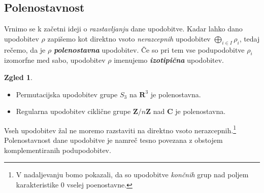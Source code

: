 \documentclass[11pt]{book}
\def\ZZ{\mathbf{Z}}
\def\RR{\mathbf{R}}
\def\CC{\mathbf{C}}
\def\definicija{\color{rdeca}\bf\em}
\theoremstyle{definition}
\theoremstyle{zgled}
\newtheorem*{zgled}{Zgled}
\theoremstyle{odprtproblem}
\theoremstyle{domacanaloga}
\theoremstyle{izrek}
\begin{document}
\subsection{Polenostavnost}

Vrnimo se k začetni ideji o \emph{razstavljanju} dane upodobitve. Kadar lahko dano upodobitev $\rho$ zapišemo kot direktno vsoto \emph{nerazcepnih} upodobitev $\bigoplus_{i \in I} \rho_i$, tedaj rečemo, da je $\rho$ {\definicija polenostavna} upodobitev. Če so pri tem vse podupodobitve $\rho_i$ izomorfne med sabo, upodobitev $\rho$ imenujemo {\definicija izotipična} upodobitev.

\begin{zgled} \leavevmode
    \begin{itemize}
        \item Permutacijska upodobitev grupe $S_3$ na $\RR^3$ je polenostavna.
        \item Regularna upodobitev ciklične grupe $\ZZ/n\ZZ$ nad $\CC$ je polenostavna.
    \end{itemize}
\end{zgled}

Vseh upodobitev žal ne moremo razstaviti na direktno vsoto nerazcepnih.\footnote{V nadaljevanju bomo pokazali, da so upodobitve \emph{končnih} grup nad poljem karakteristike $0$ vselej poenostavne.} Polenostavnost dane upodobitve je namreč tesno povezana z obstojem komplementiranih podupodobitev.
\end{document}
